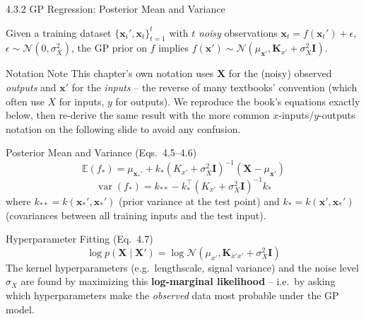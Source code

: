 \documentclass[aspectratio=169,10pt]{beamer}
\begin{document}
\begin{frame}[allowframebreaks]{4.3.2 GP Regression: Posterior Mean and Variance}

Given a training dataset $\{\mathbf{x}_i', \mathbf{x}_t\}_{t=1}^{t}$ with
$t$ \emph{noisy} observations $\mathbf{x}_t = f(\mathbf{x}_t') + \epsilon$,
$\epsilon \sim \mathcal{N}(0, \sigma_X^2)$, the GP prior on $f$ implies
$f(\mathbf{x}') \sim \mathcal{N}(\mu_{\mathbf{x}'}, \mathbf{K}_{x'} +
\sigma_X^2\mathbf{I})$.

\begin{alertblock}{Notation Note}
This chapter's own notation uses $\mathbf{X}$ for the (noisy) observed
\emph{outputs} and $\mathbf{x}'$ for the \emph{inputs} -- the reverse of
many textbooks' convention (which often use $X$ for inputs, $y$ for
outputs). We reproduce the book's equations exactly below, then re-derive
the same result with the more common $x$-inputs/$y$-outputs notation on
the following slide to avoid any confusion.
\end{alertblock}

\begin{block}{Posterior Mean and Variance (Eqs.\ 4.5--4.6)}
\[
  \mathbb{E}(f_*) = \mu_{\mathbf{x}_*'} +
    k_*\left(K_{x'} + \sigma_X^2\mathbf{I}\right)^{-1}
    \left(\mathbf{X} - \mu_{\mathbf{x}'}\right)
\]
\[
  \operatorname{var}(f_*) = k_{**} -
    k_*^{\top}\left(K_{x'} + \sigma_X^2\mathbf{I}\right)^{-1} k_*
\]
where $k_{**} = k(\mathbf{x}_*', \mathbf{x}_*')$ (prior variance at the
test point) and $k_* = k(\mathbf{x}', \mathbf{x}_*')$ (covariances
between all training inputs and the test input).
\end{block}

\begin{block}{Hyperparameter Fitting (Eq.\ 4.7)}
\[
  \log p(\mathbf{X}\mid\mathbf{X}') =
    \log \mathcal{N}\!\left(\mu_{x'}, \mathbf{K}_{x'x'} + \sigma_X^2\mathbf{I}\right)
\]
The kernel hyperparameters (e.g.\ lengthscale, signal variance) and the
noise level $\sigma_X$ are found by maximizing this
\textbf{log-marginal likelihood} -- i.e.\ by asking which hyperparameters
make the \emph{observed} data most probable under the GP model.
\end{block}

\end{frame}
\end{document}
